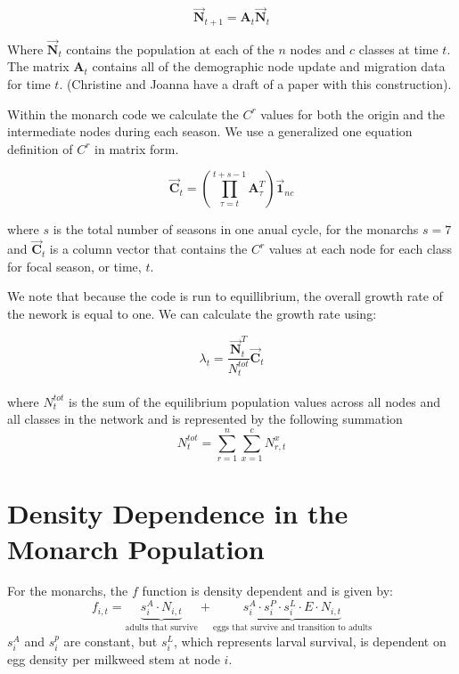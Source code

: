 \documentclass[10pt]{article}
\begin{document}
\begin{equation}
\vec{\mathbf{N}}_{t+1}={\mathbf{A}_t}\vec{\mathbf{N}}_t
\end{equation}

Where $\vec{\mathbf{N}}_{t}$ contains the population at each of the $n$ nodes and $c$ classes at time $t$. The matrix $\mathbf{A}_t$ contains all of the demographic node update and migration data for time $t$. (Christine and Joanna have a draft of a paper with this construction).


Within the monarch code we calculate the $C^r$ values for both the origin and the intermediate nodes during each season. We use a generalized one equation definition of $C^r$ in matrix form. %

\begin{equation}
\vec{\mathbf{C}}_t=\left(\prod_{\tau=t}^{t+s-1}\mathbf{A}_\tau^T\right)\vec{\mathbf{1}}_{nc}
\end{equation}

where $s$ is the total number of seasons in one anual cycle, for the monarchs $s=7$ and $\vec{\mathbf{C}}_t$ is a column vector that contains the $C^r$ values at each node for each class for focal season, or time, $t$. 

We note that because the code is run to equillibrium, the overall growth rate of the nework is equal to one. We can calculate the growth rate using:

\begin{equation}
\lambda_t= \frac{\vec{\mathbf{N}}_t^T}{N_t^{tot}}\vec{\mathbf{C}}_t
\label{lambda}
\end{equation}\\
where $N_t^{tot}$ is the sum of the equilibrium population values across all nodes and all classes in the network and is represented by the following summation
\begin{equation}
N_t^{tot}=\sum_{r=1}^n\sum_{x=1}^{c}N^x_{r,t}
\end{equation}

\section{Density Dependence in the Monarch Population}
%
For the monarchs, the $f$ function is density dependent and is given by:
\begin{equation}\label{f_update}
f_{i,t}= \underbrace{s_i^A \cdot N_{i,t}}_{\text{adults that survive}} + \underbrace{s_i^A\cdot s_i^P\cdot s_i^L\cdot E\cdot N_{i,t}}_{\text{eggs that survive and transition to adults}}
\end{equation}
%
$s_i^A$ and $s_i^p$ are constant, but $s_i^L$, which represents larval survival, is dependent on egg density per milkweed stem at node $i$.
\end{document}
